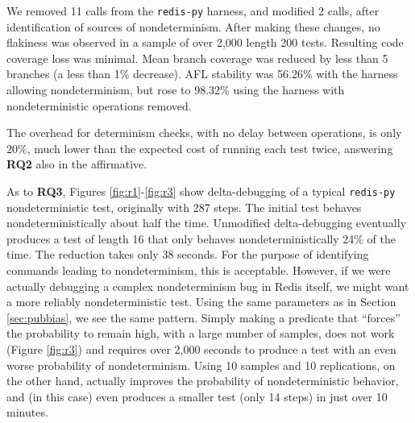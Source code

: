 {

We removed 11 calls from the {\tt redis-py} harness, and  modified 2
calls, after
identification of sources of nondeterminism.  After making these changes, no flakiness was observed in a sample of over 2,000 length
200 tests.   Resulting code coverage loss was minimal.
Mean branch coverage  was reduced
by less than 5 branches (a less than 1\% decrease).  AFL stability was 56.26\% with the harness allowing 
nondeterminism, but rose to 98.32\% using the harness with 
nondeterministic operations removed.

The overhead for
determinism checks, with no delay between operations, is only
20\%, much lower than the expected cost of running each test twice,
answering {\bf RQ2} also in the affirmative. 

As to {\bf RQ3}, Figures \ref{fig:r1}-\ref{fig:r3} show delta-debugging of a typical
{\tt redis-py} nondeterministic test, originally with 287 steps.  The initial test behaves
nondeterministically about half the time.  Unmodified delta-debugging
eventually produces a test of length 16 that only behaves
nondeterministically 24\% of the time.  The reduction takes only 38
seconds.  For the purpose of identifying commands leading to
nondeterminism, this is acceptable.  However, if we were actually
debugging a complex nondeterminism bug in Redis itself, we might want
a more reliably nondeterministic test.  Using the same parameters as
in Section \ref{sec:pubbias}, we see the same pattern.  Simply making
a predicate that ``forces'' the probability to remain high, with a
large number of samples, does not work (Figure \ref{fig:r3}) and
requires over 2,000 seconds to produce a test with an even worse
probability of nondeterminism.  Using 10 samples and 10 replications,
on the other hand, actually improves the probability of
nondeterministic behavior, and (in this case) even produces a smaller test (only 14 steps) in just
over 10 minutes.

}
